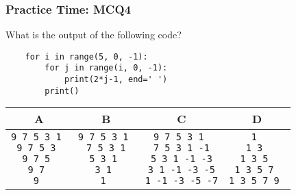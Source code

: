 \documentclass{beamer}
\begin{document}
\begin{frame}[fragile]
    \frametitle{Practice Time: MCQ4}
    What is the output of the following code?

    \begin{verbatim}
    for i in range(5, 0, -1):
        for j in range(i, 0, -1):
            print(2*j-1, end=' ')
        print()
    \end{verbatim}

    \begin{tabular}{|c|c|c|c|}
        \hline
        A & B & C & D          \\\hline
        \makecell[tl]{
        \texttt{9 7 5 3 1 }    \\
        \texttt{9 7 5 3 }      \\
        \texttt{9 7 5 }        \\
        \texttt{9 7 }          \\
        \texttt{9 }            \\
        }
          &
        \makecell[tl]{
        \texttt{9 7 5 3 1 }    \\
        \texttt{7 5 3 1}       \\
        \texttt{5 3 1 }        \\
        \texttt{3 1 }          \\
        \texttt{1 }            \\
        }
          &
        \makecell[tl]{
        \texttt{9 7 5 3 1 }    \\
        \texttt{7 5 3 1 -1}    \\
        \texttt{5 3 1 -1 -3}   \\
        \texttt{3 1 -1 -3 -5}  \\
        \texttt{1 -1 -3 -5 -7} \\
        }
          &
        \makecell[tl]{
        \texttt{1 }            \\
        \texttt{1 3 }          \\
        \texttt{1 3 5 }        \\
        \texttt{1 3 5 7 }      \\
        \texttt{1 3 5 7 9 }    \\
        }                      \\\hline
    \end{tabular}
\end{frame}
\end{document}
